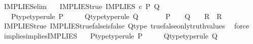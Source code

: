 \begin{isabellebody}
%
\isadelimproof
\isanewline
%
\endisadelimproof
\isanewline
{}\isamarkupfalse%
\ IMPLIES{\isacharunderscore}{\kern0pt}elim{\isacharprime}{\kern0pt}{\isacharcolon}{\kern0pt}\isanewline
\ \ \ IMPLIES{\isacharunderscore}{\kern0pt}true{\isacharcolon}{\kern0pt}\ {\isachardoublequoteopen}IMPLIES\ {\isasymcirc}\isactrlsub c\ {\isasymlangle}P{\isacharcomma}{\kern0pt}\ Q{\isasymrangle}\ {\isacharequal}{\kern0pt}\ {\isasymt}{\isachardoublequoteclose}\isanewline
\ \ \ P{\isacharunderscore}{\kern0pt}type{\isacharbrackleft}{\kern0pt}type{\isacharunderscore}{\kern0pt}rule{\isacharbrackright}{\kern0pt}{\isacharcolon}{\kern0pt}\ {\isachardoublequoteopen}P\ {\isacharcolon}{\kern0pt}\ {\isasymone}\ {\isasymrightarrow}\ {\isasymOmega}{\isachardoublequoteclose}\ \ Q{\isacharunderscore}{\kern0pt}type{\isacharbrackleft}{\kern0pt}type{\isacharunderscore}{\kern0pt}rule{\isacharbrackright}{\kern0pt}{\isacharcolon}{\kern0pt}\ {\isachardoublequoteopen}Q\ {\isacharcolon}{\kern0pt}\ {\isasymone}\ {\isasymrightarrow}\ {\isasymOmega}{\isachardoublequoteclose}\isanewline
\ \ \ {\isachardoublequoteopen}{\isacharparenleft}{\kern0pt}P\ {\isacharequal}{\kern0pt}\ {\isasymt}{\isacharparenright}{\kern0pt}\ {\isasymLongrightarrow}\ {\isacharparenleft}{\kern0pt}{\isacharparenleft}{\kern0pt}Q\ {\isacharequal}{\kern0pt}\ {\isasymt}{\isacharparenright}{\kern0pt}\ {\isasymLongrightarrow}\ R{\isacharparenright}{\kern0pt}\ {\isasymLongrightarrow}\ R{\isachardoublequoteclose}\isanewline
%
\isadelimproof
\ \ %
\endisadelimproof
%
\isatagproof
{}\isamarkupfalse%
\ IMPLIES{\isacharunderscore}{\kern0pt}true\ IMPLIES{\isacharunderscore}{\kern0pt}true{\isacharunderscore}{\kern0pt}false{\isacharunderscore}{\kern0pt}is{\isacharunderscore}{\kern0pt}false\ Q{\isacharunderscore}{\kern0pt}type\ true{\isacharunderscore}{\kern0pt}false{\isacharunderscore}{\kern0pt}only{\isacharunderscore}{\kern0pt}truth{\isacharunderscore}{\kern0pt}values\ \isamarkupfalse%
\ force%
\endisatagproof
{\isafoldproof}%
%
\isadelimproof
\isanewline
%
\endisadelimproof
\isanewline
{}\isamarkupfalse%
\ implies{\isacharunderscore}{\kern0pt}implies{\isacharunderscore}{\kern0pt}IMPLIES{\isacharcolon}{\kern0pt}\isanewline
\ \ \ P{\isacharunderscore}{\kern0pt}type{\isacharbrackleft}{\kern0pt}type{\isacharunderscore}{\kern0pt}rule{\isacharbrackright}{\kern0pt}{\isacharcolon}{\kern0pt}\ {\isachardoublequoteopen}P\ {\isacharcolon}{\kern0pt}\ {\isasymone}\ {\isasymrightarrow}\ {\isasymOmega}{\isachardoublequoteclose}\ \ Q{\isacharunderscore}{\kern0pt}type{\isacharbrackleft}{\kern0pt}type{\isacharunderscore}{\kern0pt}rule{\isacharbrackright}{\kern0pt}{\isacharcolon}{\kern0pt}\ {\isachardoublequoteopen}Q\ {\isacharcolon}{\kern0pt}\ {\isasymone}\ {\isasymrightarrow}\ {\isasymOmega}{\isachardoublequoteclose}\isanewline

\end{isabellebody}
